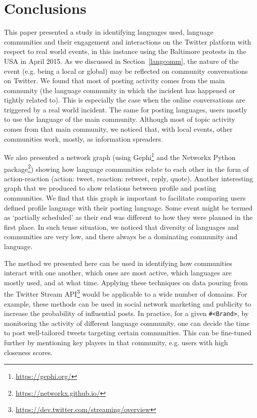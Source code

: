 \documentclass[conference]{IEEEtran}
\begin{document}
\section{Conclusions}\label{conclusions}

This paper presented a study in identifying languages used, language
communities and their engagement and interactions on the Twitter
platform with respect to real world events, in this instance using the
Baltimore protests in the USA in April 2015. As we discussed in
Section~\ref{langcomm}, the nature of the event (e.g. being a local or
global) may be reflected on community conversations on Twitter. We
found that most of posting activity comes from the main community (the
language community in which the incident has happened or tightly
related to). This is especially the case when the online conversations
are triggered by a real world incident. The same for posting
languages, users mostly to use the language of the main
community. Although most of topic activity comes from that main
community, we noticed that, with local events, other communities work,
mostly, as information spreaders.

We also presented a network graph (using
Gephi\footnote{\url{https://gephi.org/}} and the Networkx Python
package\footnote{\url{https://networkx.github.io/}}) showing how
language communities relate to each other in the form of
action-reaction (action: tweet, reaction: retweet, reply,
quote). Another interesting graph that we produced to show relations
between profile and posting communities. We find that this graph is
important to facilitate comparing users defined profile language with
their posting language. Some event might be termed as `partially
scheduled' as their end was different to how they were planned in the
first place. In such tense situation, we noticed that diversity of
languages and communities are very low, and there always be a
dominating community and language.

The method we presented here can be used in identifying how
communities interact with one another, which ones are most active,
which languages are mostly used, and at what time. Applying these
techniques on data pouring from the Twitter Stream
API\footnote{\url{https://dev.twitter.com/streaming/overview}} would
be applicable to a wide number of domains. For example, these methods
can be used in social network marketing and publicity to increase the
probability of influential posts. In practice, for a given
{\texttt{\#<Brand>}}, by monitoring the activity of different language
community, one can decide the time to post well-tailored tweets
targeting certain communities. This can be fine-tuned further by
mentioning key players in that community, e.g. users with high
closeness scores.
\end{document}
